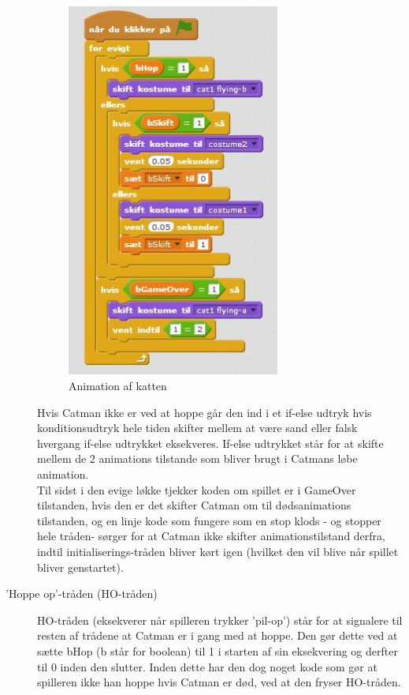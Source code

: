 \documentclass[12pt, a4paper, hidelinks]{article}
\begin{document}
\begin{description}
\begin{figure}
  \begin{center}
    \includegraphics[width=70mm]{TKatAnim.jpg}
  \end{center}
  \caption{Animation af katten}
  \label{fig:TKatAnim}
\end{figure}
\FloatBarrier

 Hvis Catman ikke er ved at hoppe går den ind i et if-else udtryk hvis konditionsudtryk hele tiden skifter mellem at være sand eller falsk hvergang if-else udtrykket eksekveres. If-else udtrykket står for at skifte mellem de 2 animations tilstande som bliver brugt i Catmans løbe animation. \\

 Til sidst i den evige løkke tjekker koden om spillet er i GameOver tilstanden, hvis den er det skifter Catman om til dødsanimations tilstanden, og en linje kode som fungere som en stop klods - og stopper hele tråden- sørger for at Catman ikke skifter animationstilstand derfra, indtil initialiserings-tråden bliver kørt igen (hvilket den vil blive når spillet bliver genstartet).



\item['Hoppe op'-tråden (HO-tråden)]  HO-tråden (eksekverer når spilleren trykker 'pil-op') står for at signalere til resten af trådene at Catman er i gang med at hoppe. Den gør dette ved at sætte bHop (b står for boolean) til 1 i starten af sin eksekvering og derfter til 0 inden den slutter. Inden dette har den dog noget kode som gør at spilleren ikke han hoppe hvis Catman er død, ved at den fryser HO-tråden.\\  


\end{description}
\end{document}
